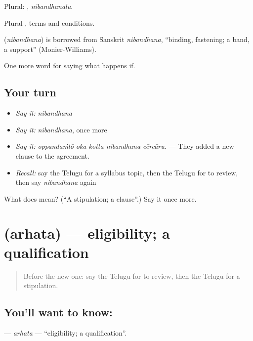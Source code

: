 Plural: , \emph{nibandhanalu}.

Plural , terms and conditions.

\begin{cousinweb}
\textbf{} (\emph{nibandhana}) is borrowed from Sanskrit \emph{nibandhana}, \textquotedblleft{}binding, fastening; a band, a support\textquotedblright{} (Monier-Williams).
\end{cousinweb}

\begin{grammarlens}[title={What you've built}]
One more word for saying what happens if.
\end{grammarlens}

\subsection*{Your turn}
\begin{itemize}
\raggedright
  \item \emph{Say it:} \emph{nibandhana}
  \item \emph{Say it:} \emph{nibandhana}, once more
  \item \emph{Say it:} \emph{oppandaṁlō oka kotta nibandhana cērcāru.} — They added a new clause to the agreement.
  \item \emph{Recall:} say the Telugu for a syllabus topic, then the Telugu for to review, then say \emph{nibandhana} again
\end{itemize}

\begin{tcolorbox}[breakable,colback=teal!4,colframe=teal!35!black,title={Before you move on}]
What does  mean? (\textquotedblleft{}A stipulation; a clause\textquotedblright{}.) Say it once more.
\end{tcolorbox}
\section[\texorpdfstring{\te{అర్హత} (arhata)}{అర్హత (arhata)}]{ (arhata) — eligibility; a qualification}

\label{lesson:TE-C417-arhata}



\begin{quote}
Before the new one: say the Telugu for to review, then the Telugu for a stipulation.
\end{quote}

\subsection*{You'll want to know: }
\textbf{} — \emph{arhata} — \textquotedblleft{}eligibility; a qualification\textquotedblright{}.

